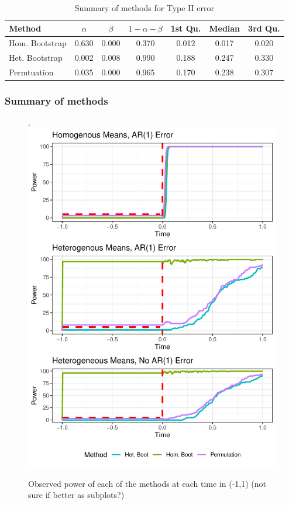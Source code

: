 \documentclass{article}
\begin{document}
\begin{table}[ht]
\centering
\begin{tabular}{lcccccc}
  \hline
Method & $\alpha$ & $\beta$ & $1 - \alpha - \beta$ & 1st Qu. & Median & 3rd Qu. \\ 
  \hline
Hom. Bootstrap & 0.630 & 0.000 & 0.370 & 0.012 & 0.017 & 0.020 \\ 
  Het. Bootstrap & 0.002 & 0.008 & 0.990 & 0.188 & 0.247 & 0.330 \\ 
  Permtuation & 0.035 & 0.000 & 0.965 & 0.170 & 0.238 & 0.307 \\ 
   \hline
\end{tabular}
\caption{Summary of methods for Type II error} 
\label{tab:type_2_summary}
\end{table}

\subsubsection{Summary of methods}



\begin{figure}[H]
\centering.
\includegraphics{typeII_time.pdf}
\caption{Observed power of each of the methods at each time in (-1,1) (not sure if better as subplots?)}
\label{fig:time_power_plot}
\end{figure}
\end{document}
